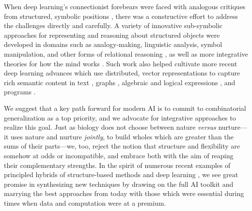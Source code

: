 When deep learning's connectionist \citep{rumelhart1987parallel} forebears were faced with analogous critiques from structured, symbolic positions \citep{fodor1988connectionism,pinker1988language}, there was a constructive effort \citep{bobrow1990on,marcus2001algebraic} to address the challenges directly and carefully.
A variety of innovative sub-symbolic approaches for representing and reasoning about structured objects were developed in domains such as analogy-making, linguistic analysis, symbol manipulation, and other forms of relational reasoning \citep{smolensky1990tensor,hinton1990mapping,pollack1990recursive,elman1991distributed,plate1995holographic,eliasmith2013build}, as well as more integrative theories for how the mind works \citep{marcus2001algebraic}.
%
Such work also helped cultivate more recent deep learning advances which use distributed, vector representations to capture rich semantic content in text \citep{mikolov2013linguistic,pennington2014glove}, graphs \citep{narayanan2016subgraph2vec,narayanan2017graph2vec}, algebraic and logical expressions \citep{allamanis2016learning,evans2018can}, and programs \citep{devlin2017semantic,chen2018tree}.

We suggest that a key path forward for modern AI is to commit to combinatorial generalization as a top priority, and we advocate for integrative approaches to realize this goal.
%
Just as biology does not choose between nature \emph{versus} nurture---it uses nature and nurture \emph{jointly}, to build wholes which are greater than the sums of their parts---we, too, reject the notion that structure and flexibility are somehow at odds or incompatible, and embrace both with the aim of reaping their complementary strengths.
%
In the spirit of numerous recent examples of principled hybrids of structure-based methods and deep learning \citep[e.g.,][]{reed2015neural,garnelo2016towards,ritchie2016deep,wu2017learning,denil2017programmable,hudson2018compositional}, we see great promise in synthesizing new techniques by drawing on the full AI toolkit and marrying the best approaches from today with those which were essential during times when data and computation were at a premium.

